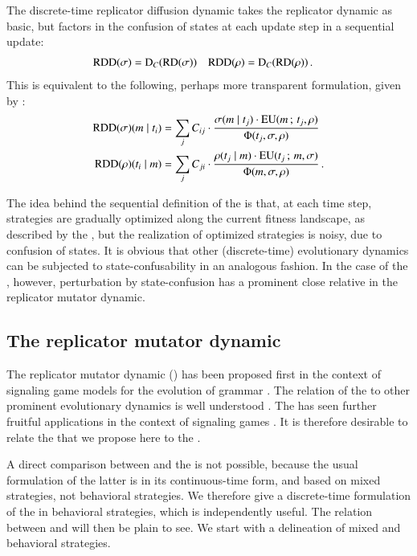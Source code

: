 The discrete-time replicator diffusion dynamic takes the replicator
dynamic as basic, but factors in the confusion of states at each
update step in a sequential update:
\begin{align*}
  \mathrm{RDD}(\sigma) & = \mathrm{D}_C(\mathrm{RD}(\sigma)) &   \mathrm{RDD}(\rho) & = \mathrm{D}_C(\mathrm{RD}(\rho)) \,.
\end{align*}
This is equivalent to the following, perhaps more transparent
formulation, given by \citet{Correia2013:The-Bivalent-Tr}:
\begin{align*}
  \mathrm{RDD}(\sigma)(m \mid t_i) & = \sum_{j} C_{ij} \cdot
  \frac{\sigma(m \mid t_j) \cdot
    \mathrm{EU}(m \thinspace ; \thinspace t_j,\rho)}
  {\Phi(t_j,\sigma, \rho)} \\
    \mathrm{RDD}(\rho)(t_i \mid m) & = \sum_{j} C_{ji} \cdot
  \frac{\rho(t_j \mid m) \cdot
    \mathrm{EU}(t_j \thinspace ; \thinspace m,\sigma)} {\Phi(m,\sigma, \rho)}  \,.
\end{align*}

The idea behind the sequential definition of the \rdd is that, at each
time step, strategies are gradually optimized along the current
fitness landscape, as described by the \rd, but the realization of
optimized strategies is noisy, due to confusion of states. It is
obvious that other (discrete-time) evolutionary dynamics can be
subjected to state-confusability in an analogous fashion. In the case
of the \rd, however, perturbation by state-confusion has a prominent
close relative in the replicator mutator dynamic.

\subsection{The replicator mutator dynamic}

The replicator mutator dynamic (\rmd) has been proposed first in the
context of signaling game models for the evolution of grammar
\citep[e.g.][]{KomarovaNiyogi2001:The-Evolutionar,NowakKomarova2001:Evolution-of-Un,Nowak2006:Evolutionary-Dy}. The
relation of the \rmd to other prominent evolutionary dynamics is well
understood \citep{PageNowak2002:Unifying-Evolut}. The \rmd has seen
further fruitful applications in the context of signaling games
\citep[e.g.][]{HutteggerSkyrms2010:Evolutionary-Dy,Deo2014:The-Semantic-an}. It
is therefore desirable to relate the \rdd that we propose here to the
\rmd.

A direct comparison between \rdd and the \rmd is not possible, because
the usual formulation of the latter is in its continuous-time form,
and based on mixed strategies, not behavioral strategies. We therefore
give a discrete-time formulation of the \rmd in behavioral strategies,
which is independently useful. The relation between \rdd and \rmd will
then be plain to see. We start with a delineation of mixed and
behavioral strategies.

